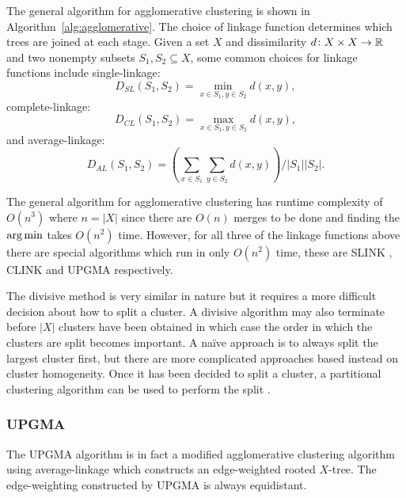 The general algorithm for agglomerative clustering is shown in
Algorithm~\ref{alg:agglomerative}.  The choice of linkage function determines
which trees are joined at each stage.  Given a set $X$ and dissimilarity $d
\colon X \times X \to {\mathbb R}$ and two nonempty subsets $S_1,S_2 \subseteq X$,
some common choices for linkage functions include single-linkage:
\begin{equation}
  \label{eq:slink}
  D_{SL}(S_1,S_2) = \min_{x \in S_1, y \in S_2} d(x,y),
\end{equation}
complete-linkage:
\begin{equation}
  \label{eq:clink}
  D_{CL}(S_1,S_2) = \max_{x \in S_1, y \in S_2} d(x,y),
\end{equation}
and average-linkage:
\begin{equation}
  \label{eq:alink}
  D_{AL}(S_1,S_2) = \left( \sum_{x \in S_1} \sum_{y \in S_2} d(x,y) \right) / |S_1| |S_2|.
\end{equation}

The general algorithm for agglomerative clustering has runtime complexity of
$O(n^3)$ where $n = |X|$ since there are $O(n)$ merges to be done and finding
the $\operatorname*{arg\,min}$ takes $O(n^2)$ time.  However, for all three of the linkage
functions above there are special algorithms which run in only $O(n^2)$ time,
these are SLINK \citep{sibson1973slink}, CLINK \citep{defays1977efficient} and
UPGMA \citep{sokal1958statistical} respectively.

The divisive method is very similar in nature but it requires a more difficult
decision about how to split a cluster.  A divisive algorithm may also
terminate before $|X|$ clusters have been obtained in which case the order in
which the clusters are split becomes important.  A naïve approach is to always
split the largest cluster first, but there are more complicated approaches
based instead on cluster homogeneity.  Once it has been decided to split a
cluster, a partitional clustering algorithm can be used to perform the split
\citep{ding2002cluster}.

\subsubsection{UPGMA}
\label{sec:upgma}

The UPGMA algorithm is in fact a modified agglomerative clustering algorithm
using average-linkage which constructs an edge-weighted rooted $X$-tree.  The
edge-weighting constructed by UPGMA is always equidistant.

